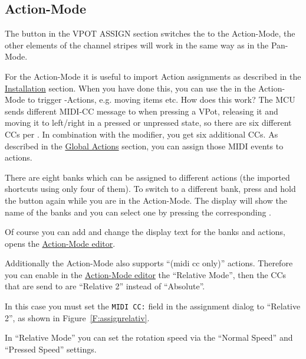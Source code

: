 \subsection{Action-Mode}\label{actionmode} 

The button \eq in the VPOT ASSIGN section switches the \vpots to the
Action-Mode, the other elements of the channel stripes will work in
the same way as in the Pan-Mode.

For the Action-Mode it is useful to import Action assignments as described in
the \hyperref[installation]{Installation} section.
When you have done this, you can use the \vpots in the Action-Mode to
trigger \reaper-Actions, e.g.  moving items etc. How does this work?
The MCU sends different MIDI-CC message to \reaper when pressing a
VPot, releasing it and moving it to left/right in a pressed or
unpressed state, so there are six different CCs per \vpots.  In
combination with the \shift modifier, you get six additional CCs. As
described in the \hyperref[globalactions]{Global Actions} section, you
can assign those MIDI events to \reaper actions.

There are eight banks which can be assigned to different actions (the
imported shortcuts using only four of them). To switch to a different
bank, press and hold the \eq button again while you are in the Action-Mode.
The display will show the name of the banks and you can select one by
pressing the corresponding \vpot.

Of course you can add and change the display text for the banks and
actions, \alt \eq opens the \hyperref[F:Screenshot_Action_Mode]{Action-Mode
editor}.



Additionally the Action-Mode also supports  ``(midi cc only)'' actions. Therefore
you can enable in the \hyperref[F:Screenshot_Action_Mode]{Action-Mode
editor} the ``Relative Mode'', then the CCs that are send to \reaper are
``Relative 2'' instead of ``Absolute''. 


In this case you must set the {\tt MIDI CC:} field in the \reaper assignment
dialog to ``Relative 2'', as shown in Figure~\ref{F:assignrelativ}.

In ``Relative Mode'' you can set the rotation speed via the ``Normal Speed''
and ``Pressed Speed'' settings.

